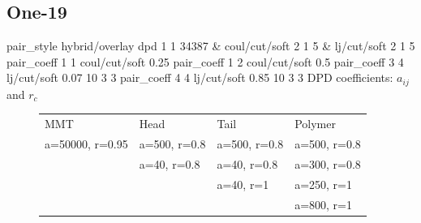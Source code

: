 \documentclass[a4paper]{article}
\begin{document}
\subsection*{One-19}
pair\_style hybrid/overlay dpd 1 1 34387 \& coul/cut/soft 2 1 5 \& 
lj/cut/soft 2 1 5\newline
pair\_coeff 1 1 coul/cut/soft 0.25
pair\_coeff 1 2 coul/cut/soft 0.5\newline
pair\_coeff 3 4 lj/cut/soft 0.07    10 3 3\newline
pair\_coeff 4 4 lj/cut/soft 0.85    10 3 3\newline
DPD coefficients: $a_{ij}$ and $r_c$
\begin{figure}[H]\begin{tabular}{llll}
MMT             & Head         & Tail         & Polymer      \\
a=50000, r=0.95 & a=500, r=0.8 & a=500, r=0.8 & a=500, r=0.8 \\
                & a=40,  r=0.8 & a=40,  r=0.8 & a=300, r=0.8 \\
                &              & a=40,  r=1   & a=250, r=1   \\
                &              &              & a=800, r=1   \\
\end{tabular}\end{figure}
\end{document}
